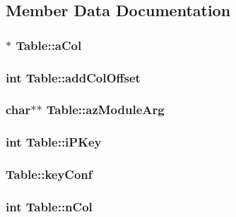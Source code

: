 \subsection{Member Data Documentation}
\hypertarget{struct_table_a87ec3b706ecf9545bd9ed582a12ce3e7}{
\subsubsection[{a\-Col}]{$\ast$ Table\-::a\-Col}}\label{struct_table_a87ec3b706ecf9545bd9ed582a12ce3e7}
\hypertarget{struct_table_ab6f1ad10bce5c20faca55cd0a9c3f1ff}{
\subsubsection[{add\-Col\-Offset}]{\setlength{\rightskip}{0pt plus 5cm}int Table\-::add\-Col\-Offset}}\label{struct_table_ab6f1ad10bce5c20faca55cd0a9c3f1ff}
\hypertarget{struct_table_af3af6596efa41894bcd3c3c9f9b6781f}{
\subsubsection[{az\-Module\-Arg}]{\setlength{\rightskip}{0pt plus 5cm}char$\ast$$\ast$ Table\-::az\-Module\-Arg}}\label{struct_table_af3af6596efa41894bcd3c3c9f9b6781f}
\hypertarget{struct_table_ab6c8b60da43ccc8a2e2b5b65cc74058f}{
\subsubsection[{i\-P\-Key}]{\setlength{\rightskip}{0pt plus 5cm}int Table\-::i\-P\-Key}}\label{struct_table_ab6c8b60da43ccc8a2e2b5b65cc74058f}
\hypertarget{struct_table_add1b22425db781d976d25b4465a2965a}{
\subsubsection[{key\-Conf}]{ Table\-::key\-Conf}}\label{struct_table_add1b22425db781d976d25b4465a2965a}
\hypertarget{struct_table_a2b3925b85368f0367322ab66bf289163}{
\subsubsection[{n\-Col}]{\setlength{\rightskip}{0pt plus 5cm}int Table\-::n\-Col}}\label{struct_table_a2b3925b85368f0367322ab66bf289163}
